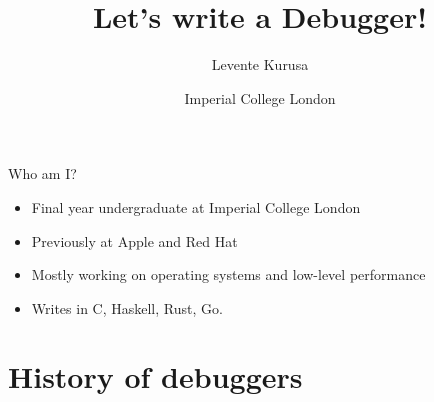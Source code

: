 \documentclass{beamer} %
\title{Let's write a Debugger!}
\author{Levente Kurusa \myemail}
\date{Imperial College London}
\institute{\texttt{linux.conf.au 2018}, Sydney, Australia \hfill January 25, 2018}
\begin{document}
\maketitle

\begin{frame}{Who am I?}
\begin{itemize}
  \item Final year undergraduate at Imperial College London
  \item Previously at Apple and Red Hat
  \item Mostly working on operating systems and low-level performance
  \item Writes in C, Haskell, Rust, Go.
\end{itemize}
\end{frame}

\section{History of debuggers}
\end{document}
